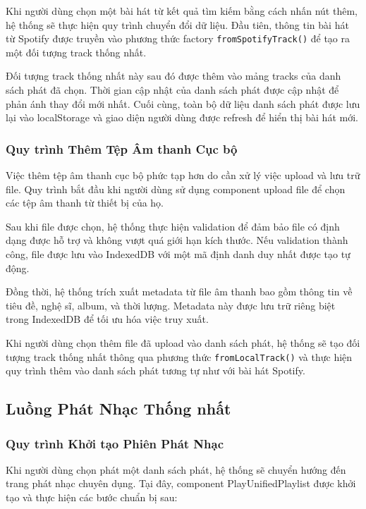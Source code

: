 \documentclass[12pt,a4paper]{article}
\begin{document}
Khi người dùng chọn một bài hát từ kết quả tìm kiếm bằng cách nhấn nút thêm, hệ thống sẽ thực hiện quy trình chuyển đổi dữ liệu. Đầu tiên, thông tin bài hát từ Spotify được truyền vào phương thức factory \texttt{fromSpotifyTrack()} để tạo ra một đối tượng track thống nhất.

Đối tượng track thống nhất này sau đó được thêm vào mảng tracks của danh sách phát đã chọn. Thời gian cập nhật của danh sách phát được cập nhật để phản ánh thay đổi mới nhất. Cuối cùng, toàn bộ dữ liệu danh sách phát được lưu lại vào localStorage và giao diện người dùng được refresh để hiển thị bài hát mới.

\subsubsection{Quy trình Thêm Tệp Âm thanh Cục bộ}

Việc thêm tệp âm thanh cục bộ phức tạp hơn do cần xử lý việc upload và lưu trữ file. Quy trình bắt đầu khi người dùng sử dụng component upload file để chọn các tệp âm thanh từ thiết bị của họ.

Sau khi file được chọn, hệ thống thực hiện validation để đảm bảo file có định dạng được hỗ trợ và không vượt quá giới hạn kích thước. Nếu validation thành công, file được lưu vào IndexedDB với một mã định danh duy nhất được tạo tự động.

Đồng thời, hệ thống trích xuất metadata từ file âm thanh bao gồm thông tin về tiêu đề, nghệ sĩ, album, và thời lượng. Metadata này được lưu trữ riêng biệt trong IndexedDB để tối ưu hóa việc truy xuất.

Khi người dùng chọn thêm file đã upload vào danh sách phát, hệ thống sẽ tạo đối tượng track thống nhất thông qua phương thức \texttt{fromLocalTrack()} và thực hiện quy trình thêm vào danh sách phát tương tự như với bài hát Spotify.

\subsection{Luồng Phát Nhạc Thống nhất}

\subsubsection{Quy trình Khởi tạo Phiên Phát Nhạc}

Khi người dùng chọn phát một danh sách phát, hệ thống sẽ chuyển hướng đến trang phát nhạc chuyên dụng. Tại đây, component PlayUnifiedPlaylist được khởi tạo và thực hiện các bước chuẩn bị sau:
\end{document}
